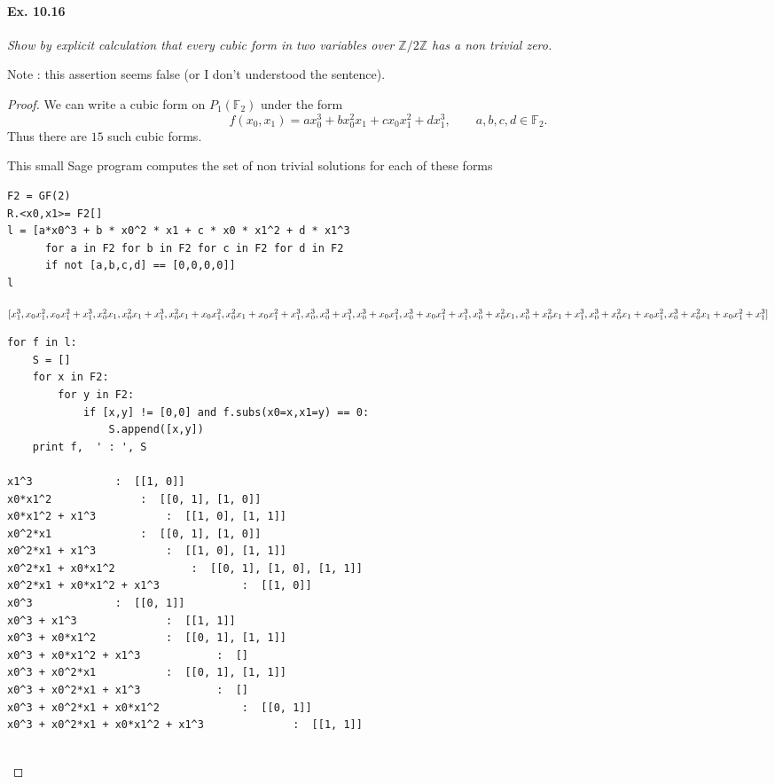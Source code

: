 \documentclass[11pt,a4paper]{article}
\newcommand{\Z}{\mathbb{Z}}
\newcommand{\F}{\mathbb{F}}
\begin{document}
\paragraph{Ex. 10.16} {\it Show by explicit calculation that every cubic form in two variables over $\Z/2\Z$ has a non trivial zero.
}
\medskip

Note : this assertion seems false  (or I don't understood the sentence).

\begin{proof} 

We can write a cubic form on $P_1(\F_2)$ under the form
$$f(x_0,x_1) = a x_0^3 + b x_0^2 x_1 + c x_0 x_1^2 + d x_1^3,\qquad a,b,c,d \in \F_2.$$
Thus there are $15$ such cubic forms. 

This small Sage program computes the set of non trivial solutions for each of these forms

\begin{verbatim}
F2 = GF(2)
R.<x0,x1>= F2[]
l = [a*x0^3 + b * x0^2 * x1 + c * x0 * x1^2 + d * x1^3 
      for a in F2 for b in F2 for c in F2 for d in F2 
      if not [a,b,c,d] == [0,0,0,0]]
l
\end{verbatim}

$[x_{1}^{3}, x_{0} x_{1}^{2}, x_{0} x_{1}^{2} + x_{1}^{3}, x_{0}^{2} x_{1}, x_{0}^{2} x_{1} + x_{1}^{3}, x_{0}^{2} x_{1} + x_{0} x_{1}^{2},x_{0}^{2} x_{1} + x_{0} x_{1}^{2} + x_{1}^{3}, x_{0}^{3}, x_{0}^{3} +x_{1}^{3},\\
 x_{0}^{3} + x_{0} x_{1}^{2}, x_{0}^{3} + x_{0} x_{1}^{2} +x_{1}^{3}, x_{0}^{3} + x_{0}^{2} x_{1}, x_{0}^{3} + x_{0}^{2} x_{1} +x_{1}^{3}, x_{0}^{3} + x_{0}^{2} x_{1} + x_{0} x_{1}^{2}, x_{0}^{3} +x_{0}^{2} x_{1} + x_{0} x_{1}^{2} + x_{1}^{3}]$


\begin{verbatim}
for f in l:
    S = []
    for x in F2:
        for y in F2:
            if [x,y] != [0,0] and f.subs(x0=x,x1=y) == 0:
                S.append([x,y])
    print f,  ' : ', S
    
x1^3 			 :  [[1, 0]]
x0*x1^2 			 :  [[0, 1], [1, 0]]
x0*x1^2 + x1^3 			 :  [[1, 0], [1, 1]]
x0^2*x1 			 :  [[0, 1], [1, 0]]
x0^2*x1 + x1^3 			 :  [[1, 0], [1, 1]]
x0^2*x1 + x0*x1^2 			 :  [[0, 1], [1, 0], [1, 1]]
x0^2*x1 + x0*x1^2 + x1^3 			 :  [[1, 0]]
x0^3 			 :  [[0, 1]]
x0^3 + x1^3 			 :  [[1, 1]]
x0^3 + x0*x1^2 			 :  [[0, 1], [1, 1]]
x0^3 + x0*x1^2 + x1^3 			 :  []
x0^3 + x0^2*x1 			 :  [[0, 1], [1, 1]]
x0^3 + x0^2*x1 + x1^3 			 :  []
x0^3 + x0^2*x1 + x0*x1^2 			 :  [[0, 1]]
x0^3 + x0^2*x1 + x0*x1^2 + x1^3 			 :  [[1, 1]]


\end{verbatim}
\end{proof}
\end{document}
